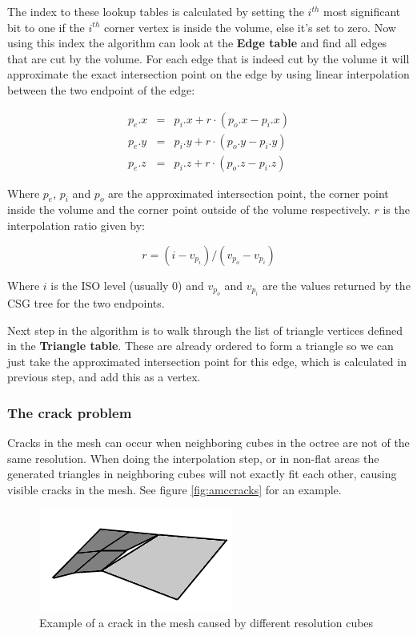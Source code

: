 \documentclass[a4wide,10pt,twocolumn]{article}
\begin{document}
The index to these lookup tables is calculated by setting the $i^{th}$ most significant bit to one if the $i^{th}$ corner vertex is inside the volume, else it's set to zero. Now using this index the algorithm can look at the \textbf{Edge table} and find all edges that are cut by the volume. For each edge that is indeed cut by the volume it will approximate the exact intersection point on the edge by using linear interpolation between the two endpoint of the edge:

\begin{eqnarray}
    p_e.x & = & p_i.x + r \cdot (p_o.x - p_i.x) \\
    p_e.y & = & p_i.y + r \cdot (p_o.y - p_i.y) \\
    p_e.z & = & p_i.z + r \cdot (p_o.z - p_i.z)
\end{eqnarray}

Where $p_e$, $p_i$ and $p_o$ are the approximated intersection point, the corner point inside the volume and the corner point outside of the volume respectively. $r$ is the interpolation ratio given by:

\begin{equation}
    r = (i - v_{p_i}) / (v_{p_o} - v_{p_i})
\end{equation}

Where $i$ is the ISO level (usually 0) and $v_{p_o}$ and $v_{p_i}$ are the values returned by the CSG tree for the two endpoints.

Next step in the algorithm is to walk through the list of triangle vertices defined in the \textbf{Triangle table}. These are already ordered to form a triangle so we can just take the approximated intersection point for this edge, which is calculated in previous step, and add this as a vertex.

\subsubsection{The crack problem}
\label{sect:crack_problem}

Cracks in the mesh can occur when neighboring cubes in the octree are not of the same resolution. When doing the interpolation step, or in non-flat areas the generated triangles in neighboring cubes will not exactly fit each other, causing visible cracks in the mesh. See figure \ref{fig:amccracks} for an example.

    \begin{figure}[h]
        \begin{center}
            \includegraphics[scale=0.8]{./images/amccrack}
        \end{center}
        \caption{Example of a crack in the mesh caused by different resolution cubes}
        \label{figure:amccracks}
    \end{figure}
\end{document}
